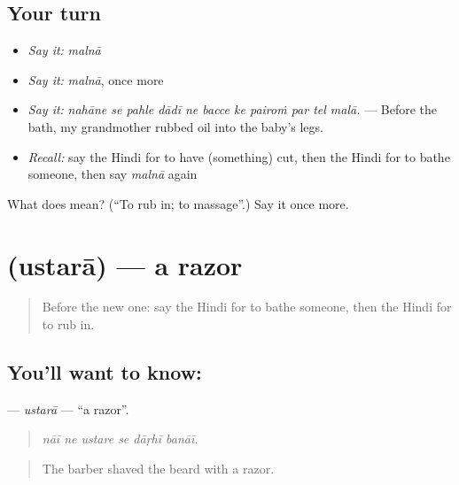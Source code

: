 \subsection*{Your turn}
\begin{itemize}
\raggedright
  \item \emph{Say it:} \emph{malnā}
  \item \emph{Say it:} \emph{malnā}, once more
  \item \emph{Say it:} \emph{nahāne se pahle dādī ne bacce ke pairoṁ par tel malā.} — Before the bath, my grandmother rubbed oil into the baby's legs.
  \item \emph{Recall:} say the Hindi for to have (something) cut, then the Hindi for to bathe someone, then say \emph{malnā} again
\end{itemize}

\begin{tcolorbox}[breakable,colback=teal!4,colframe=teal!35!black,title={Before you move on}]
What does  mean? (\textquotedblleft{}To rub in; to massage\textquotedblright{}.) Say it once more.
\end{tcolorbox}
\section[\texorpdfstring{\hi{उस्तरा} (ustarā)}{उस्तरा (ustarā)}]{ (ustarā) — a razor}

\label{lesson:HI-C484-ustara}



\begin{quote}
Before the new one: say the Hindi for to bathe someone, then the Hindi for to rub in.
\end{quote}

\subsection*{You'll want to know: }
\textbf{} — \emph{ustarā} — \textquotedblleft{}a razor\textquotedblright{}.

\begin{quote}
     
\end{quote}

\begin{quote}
\emph{nāī ne ustare se dāṛhī banāī.}
\end{quote}

\begin{quote}
The barber shaved the beard with a razor.
\end{quote}


